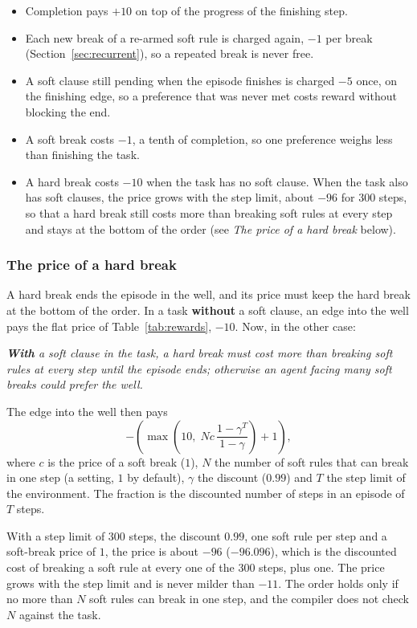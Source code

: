 \documentclass[11pt,english,listoffigures,listoftables]{tfgetsinf}
\newcommand{\keyidea}[1]{\par\smallskip\noindent\hspace*{0.6em}{\color{gray!55}\vrule width 1.5pt}\hspace{8pt}\parbox[t]{\dimexpr\linewidth-0.6em-9.5pt\relax}{\itshape #1}\par\smallskip}  %
\newcommand{\gain}[1]{\textcolor{green!40!black}{\bfseries\boldmath #1}}  %
\newcommand{\loss}[1]{\textcolor{red!60!black}{\bfseries\boldmath #1}}  %
\begin{document}
\begin{itemize}
    \item Completion pays \gain{$+10$} on top of the progress of the finishing step. 
    \item Each new break of a re-armed soft rule is charged again, \loss{$-1$} per break (Section~\ref{sec:recurrent}), so a repeated break is never free. 
    \item A soft clause still pending when the episode finishes is charged \loss{$-5$} once, on the finishing edge, so a preference that was never met costs reward without blocking the end. 
    \item A soft break costs \loss{$-1$}, a tenth of completion, so one preference weighs less than finishing the task.
    \item A hard break costs \loss{$-10$} when the task has no soft clause. When the task also has soft clauses, the price grows with the step limit, about \loss{$-96$} for 300 steps, so that a hard break still costs more than breaking soft rules at every step and stays at the bottom of the order (see \emph{The price of a hard break} below).
\end{itemize}


\subsubsection{The price of a hard break}
\label{sec:well-charge}
A hard break ends the episode in the well, and its price must keep the hard break at the bottom of the order. In a task \textbf{without} a soft clause, an edge into the well pays the flat price of Table~\ref{tab:rewards}, \loss{$-10$}. Now, in the other case:

\keyidea{\textbf{With} a soft clause in the task, a hard break must cost more than breaking soft rules at every step until the episode ends; otherwise an agent facing many soft breaks could prefer the well.}
\noindent The edge into the well then pays
\[ -\left(\max\!\left(10,\; N c\,\frac{1-\gamma^{T}}{1-\gamma}\right) + 1\right), \]
where $c$ is the price of a soft break ($1$), $N$ the number of soft rules that can break in one step (a setting, $1$ by default), $\gamma$ the discount ($0.99$) and $T$ the step limit of the environment. The fraction is the discounted number of steps in an episode of $T$ steps. 

With a step limit of 300 steps, the discount $0.99$, one soft rule per step and a soft-break price of $1$, the price is about \loss{$-96$} ($-96.096$), which is the discounted cost of breaking a soft rule at every one of the 300 steps, plus one. The price grows with the step limit and is never milder than \loss{$-11$}. The order holds only if no more than $N$ soft rules can break in one step, and the compiler does not check $N$ against the task. 
\end{document}
